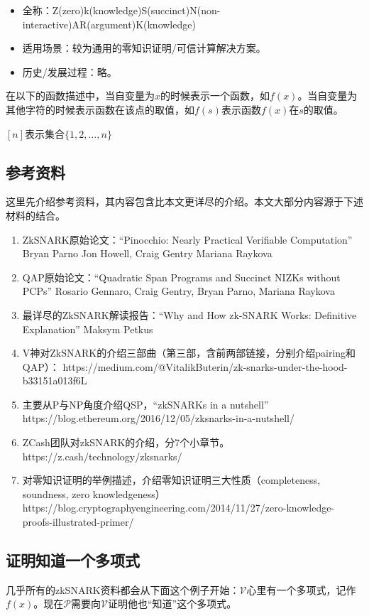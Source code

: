 \documentclass[12pt]{article}
\newcommand{\zk}{zkSNARK}
\newcommand{\pp}{$\mathcal{P}$}
\newcommand{\vv}{$\mathcal{V}$}
\begin{document}
\begin{itemize}
	\item 全称：Z(zero)k(knowledge)S(succinct)N(non-interactive)AR(argument)K(knowledge)
	\item 适用场景：较为通用的零知识证明/可信计算解决方案。
	\item 历史/发展过程：略。
\end{itemize}

在以下的函数描述中，当自变量为$x$的时候表示一个函数，如$f(x)$。当自变量为其他字符的时候表示函数在该点的取值，如$f(s)$表示函数$f(x)$在$s$的取值。

$[n]$表示集合$\{1,2,...,n\}$
\subsection{参考资料}
这里先介绍参考资料，其内容包含比本文更详尽的介绍。本文大部分内容源于下述材料的结合。
\begin{enumerate}
	\item ZkSNARK原始论文：“Pinocchio: Nearly Practical Verifiable Computation”	Bryan Parno Jon Howell, Craig Gentry Mariana Raykova 
	\item QAP原始论文：“Quadratic Span Programs and Succinct NIZKs without PCPs” Rosario Gennaro, Craig Gentry, Bryan Parno, Mariana Raykova
	\item 最详尽的ZkSNARK解读报告：“Why and How zk-SNARK Works: Definitive Explanation”	Maksym Petkus
	\item V神对ZkSNARK的介绍三部曲（第三部，含前两部链接，分别介绍pairing和QAP）：
	\newline
	https://medium.com/@VitalikButerin/zk-snarks-under-the-hood-b33151a013f6L
	\item 主要从P与NP角度介绍QSP，“zkSNARKs in a nutshell” 
	\newline
	https://blog.ethereum.org/2016/12/05/zksnarks-in-a-nutshell/
	\item ZCash团队对\zk 的介绍，分7个小章节。
		\newline
	https://z.cash/technology/zksnarks/
	\item 对零知识证明的举例描述，介绍零知识证明三大性质（completeness, soundness, zero knowledgeness）
	\newline
	https://blog.cryptographyengineering.com/2014/11/27/zero-knowledge-proofs-illustrated-primer/
\end{enumerate}
\subsection{证明知道一个多项式}
几乎所有的\zk 资料都会从下面这个例子开始：\vv 心里有一个多项式，记作$f(x)$。现在\pp 需要向\vv 证明他也“知道”这个多项式。
\end{document}
